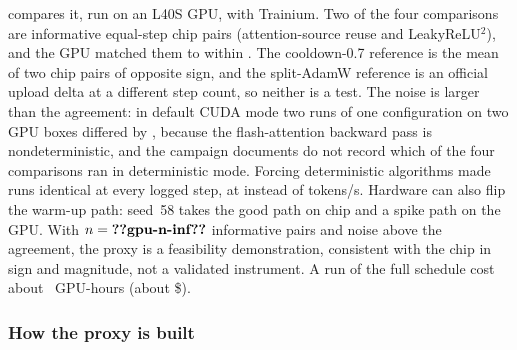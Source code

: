  compares it, run on an L40S GPU, with Trainium. Two of the four comparisons are informative equal-step
chip pairs (attention-source reuse and LeakyReLU$^2$), and the GPU matched them to within \docnum{}.
The cooldown-0.7 reference is the mean of two chip pairs of opposite sign, and the split-AdamW reference is an
official upload delta at a different step count, so neither is a test. The noise is larger than the agreement: in
default CUDA mode two runs of one configuration on two GPU boxes differed by \docnum{}, because the
flash-attention backward pass is nondeterministic, and the campaign documents do not record which of the four
comparisons ran in deterministic mode. Forcing deterministic algorithms made runs identical at every logged step, at
\docnum{} instead of \docnum{} tokens/s. Hardware can also flip the warm-up
path: seed~58 takes the good path on chip and a spike path on the GPU. With $n=\val{gpu-n-inf}$ informative pairs and
noise above the agreement, the proxy is a feasibility demonstration, consistent with the chip in sign and magnitude,
not a validated instrument. A run of the full schedule cost about \docnum{}~GPU-hours (about
\$\docnum{}).

\begin{table}[!htbp]
  \centering
  \caption{\textbf{GPU proxy vs Trainium} at equal steps, seed 73 ($10^{-3}$ bpb except the last row; values from
    \texttt{docs/SIMULATOR.md}\docnum{}). \textsuperscript{*}\,Not an informative comparison: the Trainium value is
    the mean of two chip pairs of opposite sign (), or an official delta at a different step count.}
  \label{tab:gpu}
  
\end{table}

\subsubsection{How the proxy is built}
\label{app:gpu}

